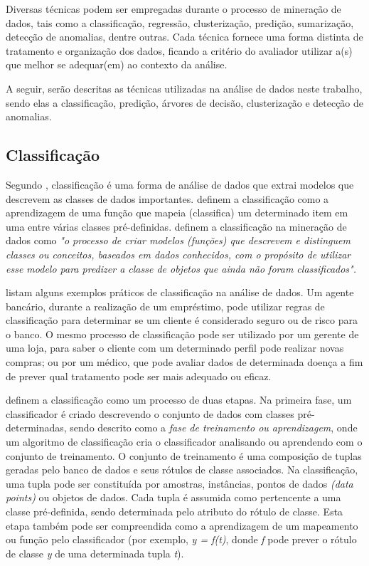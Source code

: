 Diversas técnicas podem ser empregadas durante o processo de mineração de dados, tais como a classificação, regressão, clusterização, predição, sumarização, detecção de anomalias, dentre outras. Cada técnica fornece uma forma distinta de tratamento e organização dos dados, ficando a critério do avaliador utilizar a(s) que melhor se adequar(em) ao contexto da análise. 

A seguir, serão descritas as técnicas utilizadas na análise de dados neste trabalho, sendo elas a classificação, predição, árvores de decisão, clusterização e detecção de anomalias.

\subsection{Classificação} \label{3subtitle1}

Segundo \citet{han_kamber2006}, classificação é uma forma de análise de dados que extrai modelos que descrevem as classes de dados importantes. \citet{fayyad1996} definem a classificação como a aprendizagem de uma função que mapeia (classifica) um determinado item em uma entre várias classes pré-definidas. \citet[p. 506]{cardoso_machado2008} definem a classificação na mineração de dados como \textit{"o processo de criar modelos (funções) que descrevem e distinguem classes ou conceitos, baseados em dados conhecidos, com o propósito de utilizar esse modelo para predizer a classe de objetos que ainda não foram classificados".}


\citet{han_kamber2006} listam alguns exemplos práticos de classificação na análise de dados. Um agente bancário, durante a realização de um empréstimo, pode utilizar regras de classificação para determinar se um cliente é considerado seguro ou de risco para o banco. O mesmo processo de classificação pode ser utilizado por um gerente de uma loja, para saber o cliente com um determinado perfil pode realizar novas compras; ou por um médico, que pode avaliar dados de determinada doença a fim de prever qual tratamento pode ser mais adequado ou eficaz. 

\citet{han_kamber2006} definem a classificação como um processo de duas etapas. Na primeira fase, um classificador é criado descrevendo o conjunto de dados com classes pré-determinadas, sendo descrito como a \textit{fase de treinamento ou aprendizagem}, onde um algoritmo de classificação cria o classificador analisando ou aprendendo com o conjunto de treinamento. O conjunto de treinamento é uma composição de tuplas geradas pelo banco de dados e seus rótulos de classe associados. Na classificação, uma tupla pode ser constituída por amostras, instâncias, pontos de dados \textit{(data points)} ou objetos de dados. Cada tupla é assumida como pertencente a uma classe pré-definida, sendo determinada pelo atributo do rótulo de classe. Esta etapa também pode ser compreendida como a aprendizagem de um mapeamento ou função pelo classificador (por exemplo, \textit{y = f(t)}, donde \textit{f} pode prever o rótulo de classe \textit{y} de uma determinada tupla \textit{t}).

